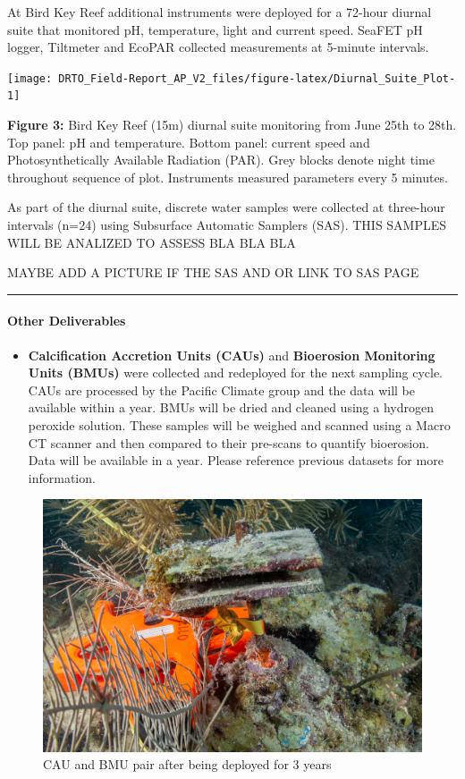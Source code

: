 \documentclass[]{article}
\providecommand{\tightlist}{%
  \setlength{\itemsep}{0pt}\setlength{\parskip}{0pt}}
\let\oldparagraph\paragraph
\renewcommand{\paragraph}[1]{\oldparagraph{#1}\mbox{}}
\begin{document}
At Bird Key Reef additional instruments were deployed for a 72-hour
diurnal suite that monitored pH, temperature, light and current speed.
SeaFET pH logger, Tiltmeter and EcoPAR collected measurements at
5-minute intervals.

\begin{center}\texttt{[image: DRTO\_Field-Report\_AP\_V2\_files/figure-latex/Diurnal\_Suite\_Plot-1]} \end{center}

\textbf{Figure 3:} Bird Key Reef (15m) diurnal suite monitoring from
June 25th to 28th. Top panel: pH and temperature. Bottom panel: current
speed and Photosynthetically Available Radiation (PAR). Grey blocks
denote night time throughout sequence of plot. Instruments measured
parameters every 5 minutes.

As part of the diurnal suite, discrete water samples were collected at
three-hour intervals (n=24) using Subsurface Automatic Samplers (SAS).
THIS SAMPLES WILL BE ANALIZED TO ASSESS BLA BLA BLA

MAYBE ADD A PICTURE IF THE SAS AND OR LINK TO SAS PAGE

\begin{center}\rule{0.5\linewidth}{0.5pt}\end{center}

\hypertarget{other-deliverables}{%
\paragraph{Other Deliverables}\label{other-deliverables}}

\begin{itemize}
\tightlist
\item
  \textbf{Calcification Accretion Units (CAUs)} and \textbf{Bioerosion
  Monitoring Units (BMUs)} were collected and redeployed for the next
  sampling cycle. CAUs are processed by the Pacific Climate group and
  the data will be available within a year. BMUs will be dried and
  cleaned using a hydrogen peroxide solution. These samples will be
  weighed and scanned using a Macro CT scanner and then compared to
  their pre-scans to quantify bioerosion. Data will be available in a
  year. Please reference previous datasets for more information.
\end{itemize}

\begin{figure}

{\centering \includegraphics[width=0.5\linewidth]{Data/CAUBMU} 

}

\caption{CAU and BMU pair after being deployed for 3 years}\label{fig:BMUs}
\end{figure}
\end{document}
